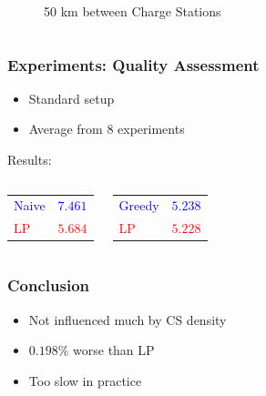 \begin{frame}
\begin{columns}[c]
\begin{center}
\begin{figure}
	  	\caption{50 km between Charge Stations}
	  	\end{figure}
   \end{center}
   \end{columns} 
\end{frame}

\begin{frame}
  \frametitle{Experiments: Quality Assessment}
  \begin{itemize}
  	\item Standard setup
  	\item Average from 8 experiments
  \end{itemize}
  \vspace{0.8cm}
  {\large Results:}
  \begin{columns}[c]
    \begin{center}
    	\begin{tabular}{ | l l |}
    	\textcolor{blue}{Naive} & \textcolor{blue}{$7.461$} \\
    	\textcolor{red}{LP} & \textcolor{red}{$5.684$} \\
    	\end{tabular}
  	\end{center}
    \begin{center}
    	\begin{tabular}{ | l l |}
    	\textcolor{blue}{Greedy} & \textcolor{blue}{$5.238$} \\
    	\textcolor{red}{LP} & \textcolor{red}{$5.228$} \\
    	\end{tabular}  
    \end{center}
   \end{columns} 
\end{frame}

\begin{frame}
  \frametitle{Conclusion}
  \begin{itemize}
  \item Not influenced much by CS density  
  \item $0.198 \%$ worse than LP
  \item Too slow in practice
  \end{itemize}
\end{frame}
